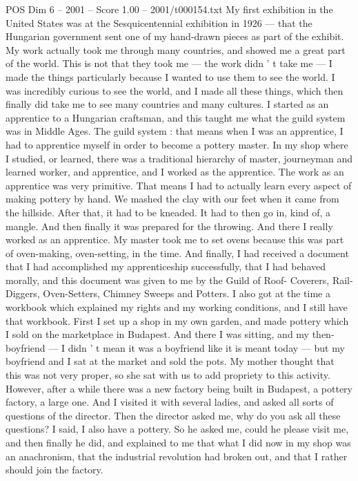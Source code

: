 \begin{textsample}{POS Dim 6 – 2001 – Score 1.00 – 2001/t000154.txt}
My first exhibition in the United States was at the Sesquicentennial exhibition in 1926 — that the Hungarian government sent one of my hand-drawn pieces as part of the exhibit.
My work actually took me through many countries, and showed me a great part of the world.
This is not that they took me — the work didn ' t take me — I made the things particularly because I wanted to use them to see the world.
I was incredibly curious to see the world, and I made all these things, which then finally did take me to see many countries and many cultures.
I started as an apprentice to a Hungarian craftsman, and this taught me what the guild system was in Middle Ages.
The guild system : that means when I was an apprentice, I had to apprentice myself in order to become a pottery master.
In my shop where I studied, or learned, there was a traditional hierarchy of master, journeyman and learned worker, and apprentice, and I worked as the apprentice.
The work as an apprentice was very primitive.
That means I had to actually learn every aspect of making pottery by hand.
We mashed the clay with our feet when it came from the hillside.
After that, it had to be kneaded.
It had to then go in, kind of, a mangle.
And then finally it was prepared for the throwing.
And there I really worked as an apprentice.
My master took me to set ovens because this was part of oven-making, oven-setting, in the time.
And finally, I had received a document that I had accomplished my apprenticeship successfully, that I had behaved morally, and this document was given to me by the Guild of Roof- Coverers, Rail-Diggers, Oven-Setters, Chimney Sweeps and Potters.
I also got at the time a workbook which explained my rights and my working conditions, and I still have that workbook.
First I set up a shop in my own garden, and made pottery which I sold on the marketplace in Budapest.
And there I was sitting, and my then-boyfriend — I didn ' t mean it was a boyfriend like it is meant today — but my boyfriend and I sat at the market and sold the pots.
My mother thought that this was not very proper, so she sat with us to add propriety to this activity.
However, after a while there was a new factory being built in Budapest, a pottery factory, a large one.
And I visited it with several ladies, and asked all sorts of questions of the director.
Then the director asked me, why do you ask all these questions?
I said, I also have a pottery.
So he asked me, could he please visit me, and then finally he did, and explained to me that what I did now in my shop was an anachronism, that the industrial revolution had broken out, and that I rather should join the factory.

\end{textsample}
